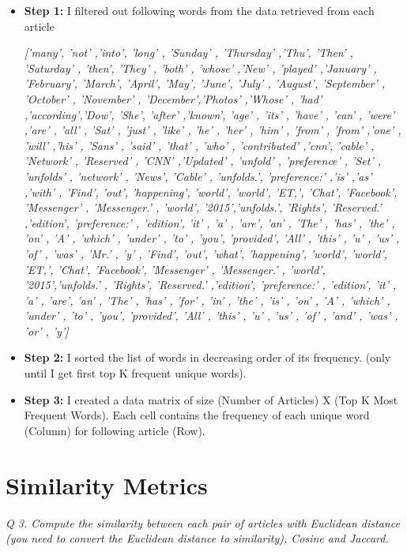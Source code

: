 \documentclass[journal,onecolumn]{IEEEtran}
\begin{document}
\begin{itemize}[label={}]

\item \textbf{Step 1: }  I filtered out following words from the data retrieved from each article

\textit{['many', 'not' ,'into', 'long' , 'Sunday' , 'Thursday' ,'Thu', 'Then' , 'Saturday' , 'then', 'They' , 'both' , 'whose' ,'New' , 'played'  ,'January' , 'February', 'March', 'April', 'May', 'June', 'July' , 'August', 'September' , 'October' , 'November' , 'December','Photos' ,'Whose' , 'had' ,'according','Dow', 'She', 'after' ,'known', 'age' , 'its' , 'have' , 'can' , 'were' ,'are' , 'all' , 'Sat' , 'just' , 'like' , 'he' , 'her' , 'him' , 'from' , 'from' ,'one' , 'will' ,'his' , 'Sans' , 'said' , 'that' , 'who' , 'contributed' ,'cnn', 'cable' , 'Network' , 'Reserved' , 'CNN' ,'Updated' , 'unfold' , 'preference' , 'Set' , 'unfolds' , 'network' , 'News', 'Cable' , 'unfolds.', 'preference:' ,'is' ,'as' ,'with' , 'Find', 'out', 'happening', 'world', 'world', 'ET,', 'Chat', 'Facebook', 'Messenger' , 'Messenger.' , 'world', '2015','unfolds.', 'Rights', 'Reserved.' ,'edition', 'preference:' , 'edition', 'it' , 'a' , 'are', 'an' , 'The' , 'has' , 'the' ,  'on' , 'A' , 'which' , 'under' , 'to' , 'you', 'provided', 'All' , 'this' , 'u' , 'us' , 'of' , 'was' , 'Mr.' , 'y' , 'Find', 'out', 'what', 'happening', 'world', 'world', 'ET,', 'Chat', 'Facebook', 'Messenger' , 'Messenger.' , 'world', '2015','unfolds.' , 'Rights', 'Reserved.' ,'edition', 'preference:' , 'edition', 'it' , 'a' , 'are', 'an' , 'The' , 'has' , 'for' , 'in' , 'the' , 'is' , 'on' , 'A' , 'which' , 'under' , 'to' , 'you', 'provided', 'All' , 'this' , 'u' , 'us' , 'of' , 'and' , 'was' , 'or' , 'y']}

\item \textbf{Step 2:} I sorted the list of words in decreasing order of its frequency. (only until I get first  top K frequent unique words).

\item \textbf{Step 3:} I created a data matrix of size (Number of Articles) X (Top K Most Frequent Words). Each cell contains the frequency of each unique word (Column) for following article (Row).

\end{itemize}

\section{\textbf{Similarity Metrics}}
\textit{Q 3. Compute the similarity between each pair of articles with Euclidean distance (you need to
convert the Euclidean distance to similarity), Cosine and Jaccard.}\\
\end{document}
